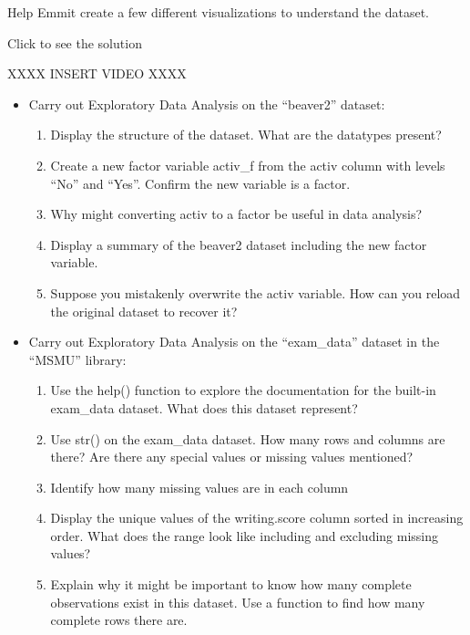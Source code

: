 \documentclass[
  letterpaper,
  DIV=11,
  numbers=noendperiod]{scrreprt}
\providecommand{\tightlist}{%
  \setlength{\itemsep}{0pt}\setlength{\parskip}{0pt}}
\begin{document}
\begin{tcolorbox}[enhanced jigsaw, colbacktitle=quarto-callout-tip-color!10!white, breakable, bottomrule=.15mm, colframe=quarto-callout-tip-color-frame, left=2mm, opacitybacktitle=0.6, title=\textcolor{quarto-callout-tip-color}{\faLightbulb}\hspace{0.5em}{Try it Out}, leftrule=.75mm, opacityback=0, rightrule=.15mm, titlerule=0mm, bottomtitle=1mm, colback=white, toprule=.15mm, arc=.35mm, toptitle=1mm, coltitle=black]

Help Emmit create a few different visualizations to understand the
dataset.

Click to see the solution

XXXX INSERT VIDEO XXXX

\end{tcolorbox}

\begin{itemize}
\tightlist
\item
  Carry out Exploratory Data Analysis on the ``beaver2'' dataset:

  \begin{enumerate}
  \def\labelenumi{\alph{enumi})}
  \tightlist
  \item
    Display the structure of the dataset. What are the datatypes
    present?
  \item
    Create a new factor variable activ\_f from the activ column with
    levels ``No'' and ``Yes''. Confirm the new variable is a factor.
  \item
    Why might converting activ to a factor be useful in data analysis?
  \item
    Display a summary of the beaver2 dataset including the new factor
    variable.
  \item
    Suppose you mistakenly overwrite the activ variable. How can you
    reload the original dataset to recover it?
  \end{enumerate}
\item
  Carry out Exploratory Data Analysis on the ``exam\_data'' dataset in
  the ``MSMU'' library:

  \begin{enumerate}
  \def\labelenumi{\alph{enumi})}
  \tightlist
  \item
    Use the help() function to explore the documentation for the
    built-in exam\_data dataset. What does this dataset represent?
  \item
    Use str() on the exam\_data dataset. How many rows and columns are
    there? Are there any special values or missing values mentioned?
  \item
    Identify how many missing values are in each column
  \item
    Display the unique values of the writing.score column sorted in
    increasing order. What does the range look like including and
    excluding missing values?
  \item
    Explain why it might be important to know how many complete
    observations exist in this dataset. Use a function to find how many
    complete rows there are.
  \end{enumerate}
\end{itemize}
\end{document}
